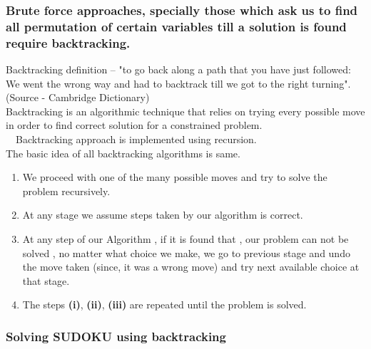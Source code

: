 \documentclass[11pt]{article}
\newcommand\tab[1][1cm]{\hspace*{#1}}
\begin{document}
\subsubsection{Brute force approaches, specially  those which ask us to find all permutation of certain variables till a solution is found require backtracking.}
\tab Backtracking definition -- "to go back along a path that you have just followed:\linebreak
We went the wrong way and had to backtrack till we got to the right turning". (Source - Cambridge Dictionary)
\\
\linebreak
\tab Backtracking is an algorithmic technique that relies on trying every possible move in order to find correct solution for a constrained problem.\\
\linebreak
\ \ Backtracking approach is implemented using recursion.\\
\linebreak
The basic idea of all backtracking algorithms is same.
\begin{enumerate}[label=(\roman*)]
\item We proceed with one of the many possible moves and try to solve the problem recursively.
\item At any stage we assume steps taken by our algorithm is correct.
\item At any step of our Algorithm , if it is found that , our problem can not be solved , no matter what choice we make, we go to previous stage and undo the move taken (since, it was a wrong move) and try next available choice at that stage.
\item The steps \textbf{(i)}, \textbf{(ii)}, \textbf{(iii)}  are repeated until the problem is solved.
\end{enumerate}
\subsubsection{Solving SUDOKU using backtracking}
\end{document}
